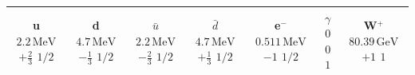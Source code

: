 \documentclass[letterpaper]{article}
\begin{document}
\begin{center}
\renewcommand{\arraystretch}{1.8}
\setlength{\tabcolsep}{8pt}
\begin{tabular}{|c|c|c|c|c|c|c|}
\hline
\parbox[c][5em][c]{2cm}{\centering \textbf{u} \\ $2.2\,\text{MeV}$ \\ $+\frac{2}{3}$ \\ $1/2$} &
\parbox[c][5em][c]{2cm}{\centering \textbf{d} \\ $4.7\,\text{MeV}$ \\ $-\frac{1}{3}$ \\ $1/2$} &
\parbox[c][5em][c]{2cm}{\centering \textbf{$\bar{u}$} \\ $2.2\,\text{MeV}$ \\ $-\frac{2}{3}$ \\ $1/2$} &
\parbox[c][5em][c]{2cm}{\centering \textbf{$\bar{d}$} \\ $4.7\,\text{MeV}$ \\ $+\frac{1}{3}$ \\ $1/2$} &
\parbox[c][5em][c]{2cm}{\centering \textbf{e$^-$} \\ $0.511\,\text{MeV}$ \\ $-1$ \\ $1/2$} &
\parbox[c][5em][c]{2cm}{\centering \textbf{$\gamma$} \\ $0$ \\ $0$ \\ $1$} &
\parbox[c][5em][c]{2cm}{\centering \textbf{W$^+$} \\ $80.39\,\text{GeV}$ \\ $+1$ \\ $1$} \\ \hline


\end{tabular}
\end{center}
\end{document}
